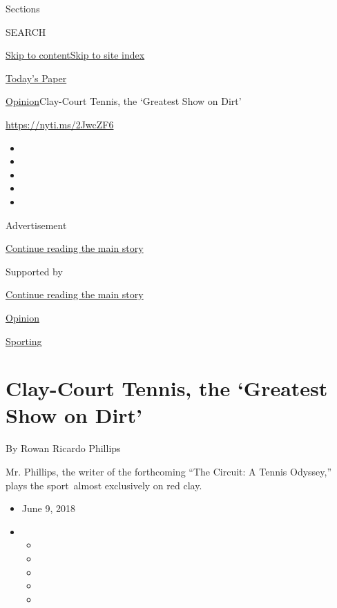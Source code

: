 Sections

SEARCH

\protect\hyperlink{site-content}{Skip to
content}\protect\hyperlink{site-index}{Skip to site index}

\href{https://myaccount.nytimes3xbfgragh.onion/auth/login?response_type=cookie\&client_id=vi}{}

\href{https://www.nytimes3xbfgragh.onion/section/todayspaper}{Today's
Paper}

\href{/section/opinion}{Opinion}\textbar{}Clay-Court Tennis, the
`Greatest Show on Dirt'

\url{https://nyti.ms/2JwcZF6}

\begin{itemize}
\item
\item
\item
\item
\item
\end{itemize}

Advertisement

\protect\hyperlink{after-top}{Continue reading the main story}

Supported by

\protect\hyperlink{after-sponsor}{Continue reading the main story}

\href{/section/opinion}{Opinion}

\href{/column/sporting}{Sporting}

\hypertarget{clay-court-tennis-the-greatest-show-on-dirt}{%
\section{Clay-Court Tennis, the `Greatest Show on
Dirt'}\label{clay-court-tennis-the-greatest-show-on-dirt}}

By Rowan Ricardo Phillips

Mr. Phillips, the writer of the forthcoming ``The Circuit: A Tennis
Odyssey,'' plays the sport~almost exclusively on red clay.

\begin{itemize}
\item
  June 9, 2018
\item
  \begin{itemize}
  \item
  \item
  \item
  \item
  \item
  \end{itemize}
\end{itemize}

